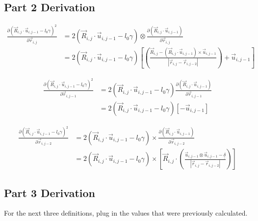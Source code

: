 \documentclass{article}
\renewcommand{\ij}{_{i,j}}
\newcommand{\ijj}{_{i,j-1}}
\newcommand{\ijjj}{_{i,j-2}}
\newcommand{\magn}[1]{\left\vert #1 \right\vert }
\renewcommand{\part}[2]{\frac{\partial #1 }{\partial #2}}
\newcommand{\ten}[1]{\underline{\underline{#1}}}
\newcommand{\rij}{\vec{r} \ij}
\newcommand{\Rij}{\vec{R} \ij}
\newcommand{\rijj}{\vec{r} \ijj}
\newcommand{\rijjj}{\vec{r} \ijjj}
\newcommand{\uijj}{\vec{u} \ijj}
\begin{document}
\subsection{Part 2 Derivation}

\begin{align*}
  \part{\left(\Rij \cdot \uijj - l_0\gamma\right)^2}{\rij }
  &=
2(\Rij \cdot \uijj - l_0\gamma)
\otimes
\part{\left(\Rij \cdot \uijj\right)}{\rij}
\\
  &=
2(\Rij \cdot \uijj - l_0\gamma)
  \left[
  \left(
  {
  \frac{\Rij - (\Rij \cdot \uijj ) \times \uijj}{\magn{\rij - \rijjj}}
  }
  \right)
  + 
  \vec{u} \ijj 
  \right] 
\end{align*}

\begin{align*}
  \part{\left(\Rij \cdot \uijj - l_0\gamma\right)^2}{\rijj }
  &=
2(\Rij \cdot \uijj - l_0\gamma)
\part{\left(\Rij \cdot \uijj\right)}{\rijj}
\\
& =
2(\Rij \cdot \uijj - l_0\gamma)
\left[
  - \uijj
\right]
\end{align*}

\begin{align*}
  \part{\left(\Rij \cdot \uijj - l_0\gamma\right)^2}{\rijjj }
  &=
2(\Rij \cdot \uijj - l_0\gamma)
\times
\part{\left(\Rij \cdot \uijj\right)}{\rijjj}
\\
& =
2(\Rij \cdot \uijj - l_0\gamma)
\times
\left[
\Rij 
\cdot 
\left(
  \frac{\uijj \otimes \uijj - \ten{\delta}}{\magn{\rij - \rijjj}}
\right)
\right]
\end{align*}

\subsection{Part 3 Derivation}
For the next three definitions, plug in the values that were previously calculated. 
\end{document}
